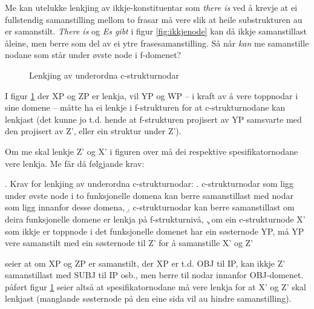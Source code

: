 \documentclass[11pt,a4paper,oneside,draft]{book}
\begin{document}
Me kan utelukke lenkjing av ikkje-konstituentar som \emph{there is} ved å
krevje at ei fullstendig samanstilling mellom to frasar må vere slik
at heile substrukturen au er samanstilt. \emph{There is} og \emph{Es gibt} i
figur \ref{fig:ikkjenode} kan då ikkje samanstillast åleine, men berre
som del av ei ytre frasesamanstilling.
Så når \emph{kan} me samanstille nodane som står under øvste node i
f-domenet?

\begin{figure}[htp]
   \vfill{} %
   \caption{Lenkjing av underordna c-strukturnodar}
   \label{fig:subnode}
  \end{figure}

I figur \ref{fig:subnode} der XP og ZP er lenkja, vil YP og WP -- i
kraft av å vere toppnodar i sine domene -- måtte ha ei lenkje i
f-strukturen for at c-strukturnodane kan lenkjast (det kunne jo
t.d. hende at f-strukturen projisert av YP samsvarte med den projisert
av Z', eller ein struktur under Z').

Om me skal lenkje Z' og X' i figuren over må dei respektive
spesifikatornodane vere lenkja. Me får då følgjande krav:

\ex. \label{subnodekrav} Krav for lenkjing av underordna
c-strukturnodar:
\a. c-strukturnodar som ligg under øvste node i to funksjonelle
    domena kan berre samanstillast med nodar som ligg innanfor desse
    domena,
\b. c-strukturnodar kan berre samanstillast om deira funksjonelle
    domene er lenkja på f-strukturnivå,
\c. om ein c-strukturnode X' som ikkje er toppnode i det funksjonelle
    domenet har ein søsternode YP, må YP vere samanstilt med ein
    søsternode til Z' for å samanstille X' og Z'


\Last[a] seier at om XP og ZP er samanstilt, der XP er t.d. OBJ til
IP, kan ikkje Z' samanstillast med SUBJ til IP osb., men berre til
nodar innanfor OBJ-domenet. \Last[c] påført figur \ref{fig:subnode}
seier altså at spesifikatornodane må vere lenkja for at X' og Z' skal
lenkjast (manglande søsternode på den eine sida vil au hindre
samanstilling).
\end{document}
